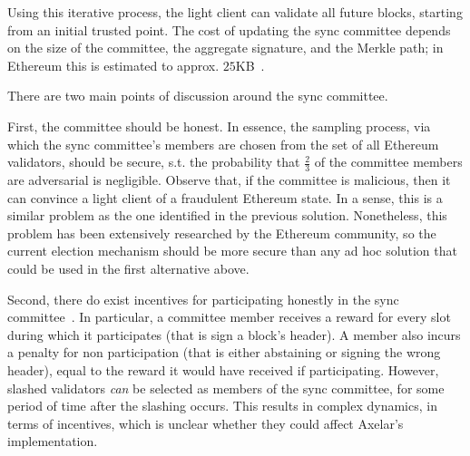 Using this iterative process, the light client can validate all future blocks,
starting from an initial trusted point. The cost of updating the sync committee
depends on the size of the committee, the aggregate signature, and the Merkle
path; in Ethereum this is estimated to approx. $25$KB~\cite{sync-committee}.

There are two main points of discussion around the sync committee.

First, the committee should be honest. In essence, the sampling process, via
which the sync committee's members are chosen from the set of all Ethereum
validators, should be secure, s.t. the probability that $\frac{2}{3}$ of the
committee members are adversarial is negligible. Observe that, if the committee
is malicious, then it can convince a light client of a fraudulent Ethereum
state. In a sense, this is a similar problem as the one identified in the
previous solution. Nonetheless, this problem has been extensively researched by
the Ethereum community, so the current election mechanism should be more secure
than any ad hoc solution that could be used in the first alternative above.

Second, there do exist incentives for participating honestly in the sync
committee~\cite{sync-committee-incentives}. In particular, a committee member
receives a reward for every slot during which it participates (that is sign a
block's header). A member also incurs a penalty for non participation (that is
either abstaining or signing the wrong header), equal to the reward it would
have received if participating.
However, slashed validators \emph{can} be selected as members of the sync
committee, for some period of time after the slashing occurs. This results in
complex dynamics, in terms of incentives, which is unclear whether they could
affect Axelar's implementation.
